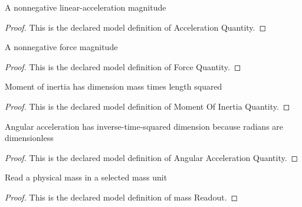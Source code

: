\begin{definition}
  \label{def:physics:phyx-mini-0706:phyxminiproblems-problemphyxmini0706-accelerationquantity}
  A nonnegative linear-acceleration magnitude
\end{definition}
\begin{proof}
  This is the declared model definition of Acceleration Quantity.
\end{proof}
\begin{definition}
  \label{def:physics:phyx-mini-0706:phyxminiproblems-problemphyxmini0706-forcequantity}
  A nonnegative force magnitude
\end{definition}
\begin{proof}
  This is the declared model definition of Force Quantity.
\end{proof}
\begin{definition}
  \label{def:physics:phyx-mini-0706:phyxminiproblems-problemphyxmini0706-momentofinertiaquantity}
  Moment of inertia has dimension mass times length squared
\end{definition}
\begin{proof}
  This is the declared model definition of Moment Of Inertia Quantity.
\end{proof}
\begin{definition}
  \label{def:physics:phyx-mini-0706:phyxminiproblems-problemphyxmini0706-angularaccelerationquantity}
  Angular acceleration has inverse-time-squared dimension because radians are dimensionless
\end{definition}
\begin{proof}
  This is the declared model definition of Angular Acceleration Quantity.
\end{proof}
\begin{definition}
  \label{def:physics:phyx-mini-0706:phyxminiproblems-problemphyxmini0706-massreadout}
  Read a physical mass in a selected mass unit
\end{definition}
\begin{proof}
  This is the declared model definition of mass Readout.
\end{proof}
